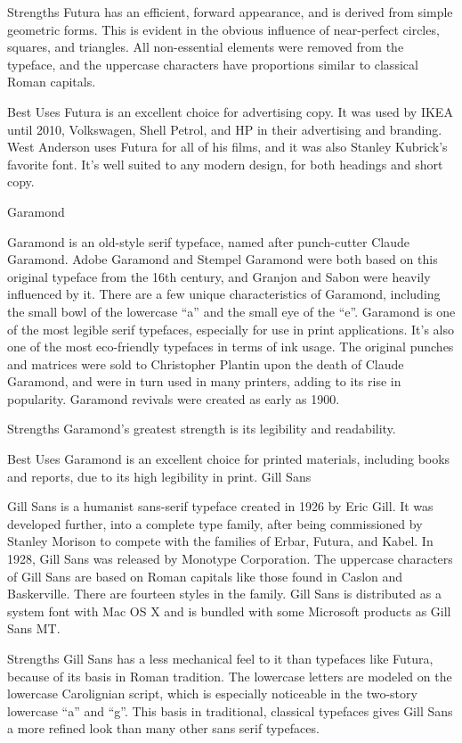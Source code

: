 \documentclass[12pt,a4paper,twocolumn]{book} %
\begin{document}
Strengths
Futura has an efficient, forward appearance, and is derived from simple geometric forms. This is evident in the obvious influence of near-perfect circles, squares, and triangles. All non-essential elements were removed from the typeface, and the uppercase characters have proportions similar to classical Roman capitals.

Best Uses
Futura is an excellent choice for advertising copy. It was used by IKEA until 2010, Volkswagen, Shell Petrol, and HP in their advertising and branding. West Anderson uses Futura for all of his films, and it was also Stanley Kubrick’s favorite font. It’s well suited to any modern design, for both headings and short copy.

 
Garamond

Garamond is an old-style serif typeface, named after punch-cutter Claude Garamond. Adobe Garamond and Stempel Garamond were both based on this original typeface from the 16th century, and Granjon and Sabon were heavily influenced by it. There are a few unique characteristics of Garamond, including the small bowl of the lowercase “a” and the small eye of the “e”.
Garamond is one of the most legible serif typefaces, especially for use in print applications. It’s also one of the most eco-friendly typefaces in terms of ink usage. The original punches and matrices were sold to Christopher Plantin upon the death of Claude Garamond, and were in turn used in many printers, adding to its rise in popularity. Garamond revivals were created as early as 1900.

Strengths
Garamond’s greatest strength is its legibility and readability.

Best Uses
Garamond is an excellent choice for printed materials, including books and reports, due to its high legibility in print.
Gill Sans

Gill Sans is a humanist sans-serif typeface created in 1926 by Eric Gill. It was developed further, into a complete type family, after being commissioned by Stanley Morison to compete with the families of Erbar, Futura, and Kabel. In 1928, Gill Sans was released by Monotype Corporation.
The uppercase characters of Gill Sans are based on Roman capitals like those found in Caslon and Baskerville. There are fourteen styles in the family. Gill Sans is distributed as a system font with Mac OS X and is bundled with some Microsoft products as Gill Sans MT.

Strengths
Gill Sans has a less mechanical feel to it than typefaces like Futura, because of its basis in Roman tradition. The lowercase letters are modeled on the lowercase Carolignian script, which is especially noticeable in the two-story lowercase “a” and “g”. This basis in traditional, classical typefaces gives Gill Sans a more refined look than many other sans serif typefaces.
\end{document}
